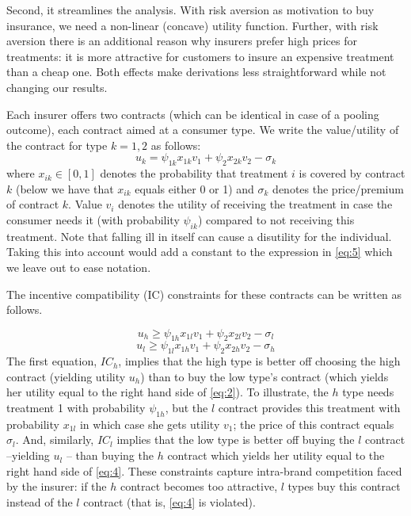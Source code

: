 \documentclass[a4paper,12pt]{article}
\begin{document}
Second, it streamlines the analysis. With risk aversion as motivation to buy insurance, we need a non-linear (concave) utility function. Further, with risk aversion there is an additional reason why insurers prefer high prices for treatments: it is more attractive for customers to insure an expensive treatment than a cheap one. Both effects make derivations less straightforward while not changing our results.

Each insurer offers two contracts (which can be identical in case of a pooling outcome), each contract aimed at a consumer type. We write the value/utility of the contract for type \(k=1,2\) as follows:
\begin{equation}
\label{eq:5}
u_{k} = \psi_{1k} x_{1k} v_1 + \psi_{2} x_{2k} v_2 - \sigma_k
\end{equation}
where \(x_{ik} \in [0,1]\) denotes the probability that treatment \(i\) is covered by contract \(k\) (below we have that \(x_{ik}\) equals either 0 or 1) and \(\sigma_k\) denotes the price/premium of contract \(k\). Value \(v_i\) denotes the utility of receiving the treatment in case the consumer needs it (with probability \(\psi_{ik}\)) compared to not receiving this treatment. Note that falling ill in itself can cause a disutility for the individual. Taking this into account would add a constant to the expression in \eqref{eq:5} which we leave out to ease notation.

The incentive compatibility (IC) constraints for these contracts can be written as follows.

\begin{equation}
\label{eq:2}
u_h \geq  \psi_{1h} x_{1l} v_1 + \psi_{2} x_{2l} v_2 - \sigma_{l}
\end{equation}
\begin{equation}
\label{eq:4}
u_l \geq  \psi_{1l} x_{1h} v_1 + \psi_{2} x_{2h} v_2 - \sigma_h
\end{equation}
The first equation, \(IC_h\), implies that the high type is better off choosing the high contract (yielding utility \(u_h\)) than to buy the low type's contract (which yields her utility equal to the right hand side of \eqref{eq:2}). To illustrate, the \(h\) type needs treatment 1 with probability \(\psi_{1h}\), but the \(l\) contract provides this treatment with probability \(x_{1l}\) in which case she gets utility \(v_{1}\); the price of this contract equals \(\sigma_{l}\). And, similarly, \(IC_l\) implies that the low type is better off buying the \(l\) contract --yielding \(u_l\) -- than buying the \(h\) contract which yields her utility equal to the right hand side of \eqref{eq:4}. These constraints capture intra-brand competition faced by the insurer: if the \(h\) contract becomes too attractive, \(l\) types buy this contract instead of the \(l\) contract (that is, \eqref{eq:4} is violated).
\end{document}
